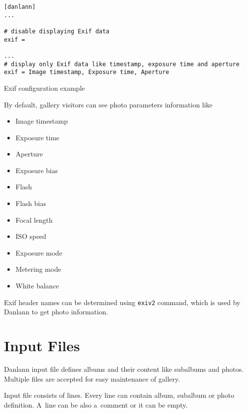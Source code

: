 \documentclass{article}
\begin{document}
\begin{listing}
\begin{lstlisting}
[danlann]
...

# disable displaying Exif data
exif =

...
# display only Exif data like timestamp, exposure time and aperture
exif = Image timestamp, Exposure time, Aperture
\end{lstlisting}
\caption{Exif configuration example}\label{conf:exif}
\end{listing}

By default, gallery visitors can see photo parameters information like

\begin{multicols}{3}
\begin{itemize}
\item Image timestamp
\item Exposure time
\item Aperture
\item Exposure bias
\item Flash
\item Flash bias
\item Focal length
\item ISO speed
\item Exposure mode
\item Metering mode
\item White balance
\end{itemize}
\end{multicols}

Exif header names can be determined using \texttt{exiv2} command, which is
used by Danlann to get photo information.


\section{Input Files}\label{albums}
Danlann input file defines albums and their content like subalbums and
photos. Multiple files are accepted for easy maintenance of gallery.

Input file consists of lines. Every line can contain album,
subalbum or photo definition. A~line can be also a~comment or it can be empty.
\end{document}
